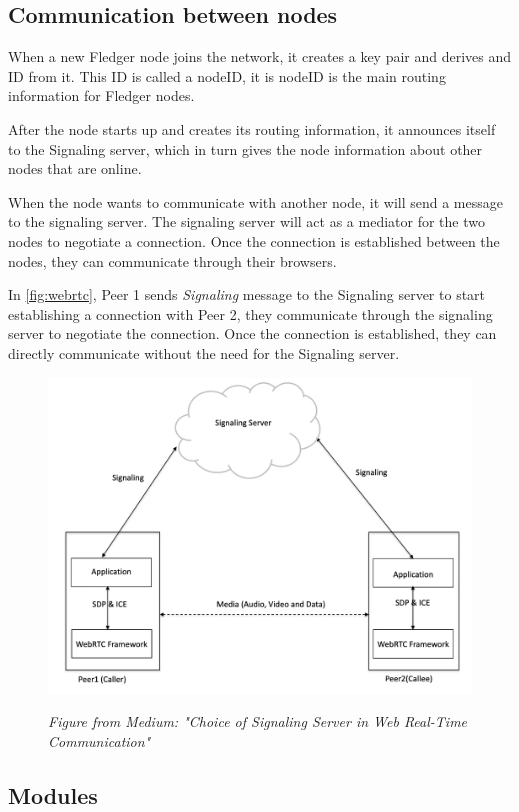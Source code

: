 \documentclass[a4paper,11pt,oneside]{report}
\begin{document}
\subsection{Communication between nodes}

When a new Fledger node joins the network, it creates a key pair and derives and ID from it. This ID is called a nodeID, it is nodeID is the main routing information for Fledger nodes. 

After the node starts up and creates its routing information, it announces itself to the Signaling server, which in turn gives the node information about other nodes that are online.

When the node wants to communicate with another node, it will send a message to the signaling server. The signaling server will act as a mediator for the two nodes to negotiate a connection. Once the connection is established between the nodes, they can communicate through their browsers.

In \autoref{fig:webrtc}, Peer 1 sends \textit{Signaling} message to the Signaling server to start establishing a connection with Peer 2, they communicate through the signaling server to negotiate the connection. Once the connection is established, they can directly communicate without the need for the Signaling server. 

\begin{figure}[H]
    \centering
    \includegraphics[width=0.8\linewidth]{plots/webrtc.png}
    \caption{}
    \label{fig:webrtc}
    \small\textit{Figure from Medium: "Choice of Signaling Server in Web Real-Time Communication"}
\end{figure}

\subsection{Modules}
\label{sec:fledger_modules}
\end{document}

